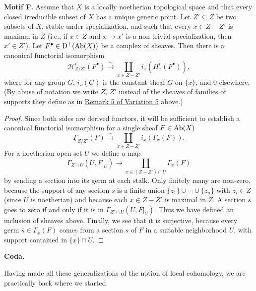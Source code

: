 \medskip{}\label{motif:4.1.F}\noindent\textbf{Motif F.} Assume that $X$ is a locally noetherian topological space and that every closed irreducible subset of $X$ has a unique generic point. Let $Z'\subseteq Z$ be two subsets of $X$, stable under specialization, and such that every $x\in Z-Z'$ is maximal in $Z$ (i.e., if $x\in Z$ and $x\to x'$ is a non-trivial specialization, then $x'\in Z'$). Let $F^\bullet\in\operatorname{D}^+(\operatorname{Ab}(X))$ be a complex of sheaves. Then there is a canonical functorial isomorphism
\[
\mathcal{H}_{Z/Z'}^{i}(F^\bullet) \xrightarrow{\sim} \coprod_{x\in Z-Z'} i_x(H_x^{i}(F^\bullet)),
\]
where for any group $G$, $i_x(G)$ is the constant sheaf $G$ on $\overline{\{x\}}$, and $0$ elsewhere. (By abuse of notation we write $Z$, $Z'$ instead of the sheaves of families of supports they define as in \hyperref[rem:4.1.var5.5]{Remark 5 of Variation 5} above.)
\begin{proof}
Since both sides are derived functors, it will be sufficient to establish a canonical functorial isomorphism for a single sheaf $F\in\operatorname{Ab}(X)$
\[
\underline{\Gamma}_{Z/Z'}(F)\xrightarrow{\sim} \coprod_{x\in Z-Z'} i_x(\Gamma_x(F)).
\]
For a noetherian open set $U$ we define a map
\[
\Gamma_{Z\cap U}(U,F|_U)\longrightarrow \coprod_{x\in (Z-Z')\cap U} \Gamma_x(F)
\]
by sending a section into its germ at each stalk. Only finitely many are non-zero, because the support of any section $s$ is a finite union $\overline{\{z_1\}}\cup\cdots\cup\overline{\{z_n\}}$ with $z_i\in Z$ (since $U$ is noetherian) and because each $x\in Z-Z'$ is maximal in $Z$. A section $s$ goes to zero if and only if it is in $\Gamma_{Z'\cap U}(U,F|_U)$. Thus we have defined an inclusion of sheaves above. Finally, we see that it is surjective, because every germ $\overline{s}\in\Gamma_x(F)$ comes from a section $s$ of $F$ in a suitable neighborhood $U$, with support contained in $\overline{\{x\}}\cap U$.
\end{proof}

\medskip\noindent\textbf{Coda.}

Having made all these generalizations of the notion of local cohomology, we are practically back where we started:

